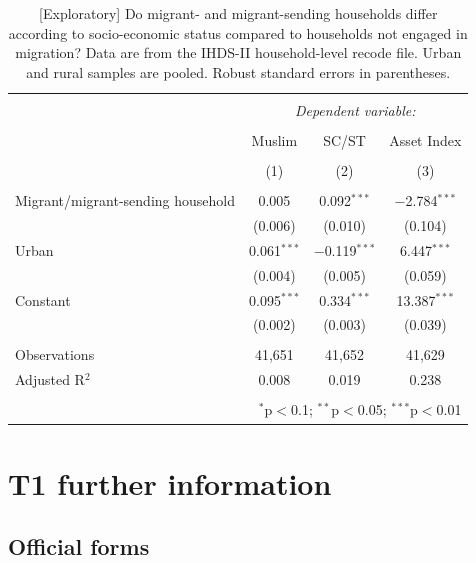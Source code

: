 \documentclass[
  11.5pt,
]{article}
\begin{document}
\begin{table}[!htbp] \centering 
  \caption{[Exploratory] Do migrant- and migrant-sending households differ according to socio-economic status compared to households not engaged in migration? Data are from the IHDS-II household-level recode file. Urban and rural samples are pooled. Robust standard errors in parentheses.} 
  \label{tab:ihds2_allmigrants_ses} 
\small 
\begin{tabular}{@{\extracolsep{5pt}}lccc} 
\\[-1.8ex]\hline 
\hline \\[-1.8ex] 
 & \multicolumn{3}{c}{\textit{Dependent variable:}} \\ 
\cline{2-4} 
\\[-1.8ex] & Muslim & SC/ST & Asset Index \\ 
\\[-1.8ex] & (1) & (2) & (3)\\ 
\hline \\[-1.8ex] 
 Migrant/migrant-sending household & 0.005 & 0.092$^{***}$ & $-$2.784$^{***}$ \\ 
  & (0.006) & (0.010) & (0.104) \\ 
  Urban & 0.061$^{***}$ & $-$0.119$^{***}$ & 6.447$^{***}$ \\ 
  & (0.004) & (0.005) & (0.059) \\ 
  Constant & 0.095$^{***}$ & 0.334$^{***}$ & 13.387$^{***}$ \\ 
  & (0.002) & (0.003) & (0.039) \\ 
 \hline \\[-1.8ex] 
Observations & 41,651 & 41,652 & 41,629 \\ 
Adjusted R$^{2}$ & 0.008 & 0.019 & 0.238 \\ 
\hline 
\hline \\[-1.8ex] 
\multicolumn{4}{r}{$^{*}$p$<$0.1; $^{**}$p$<$0.05; $^{***}$p$<$0.01} \\ 
\end{tabular} 
\end{table}

\section{T1 further information}

\subsection{Official forms}
\end{document}
